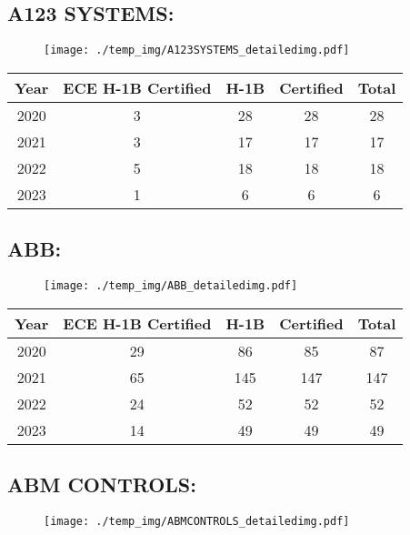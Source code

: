 \documentclass{article}%
\begin{document}
\subsection{A123 SYSTEMS:}%
\label{subsec:A123SYSTEMS}%
\label{A123SYSTEMSdetailed}%


\begin{figure}[htbp]%
\centering%
\texttt{[image: ./temp\_img/A123SYSTEMS\_detailedimg.pdf]}%
\end{figure}

%
\begin{longtable}{c|c|c|c|c}%
\hline%
Year&ECE H{-}1B Certified&H{-}1B&Certified&Total\\%
\hline%
2020&3&28&28&28\\%
\hline%
2021&3&17&17&17\\%
\hline%
2022&5&18&18&18\\%
\hline%
2023&1&6&6&6\\%
\hline%
\end{longtable}

%
\newpage%
\subsection{ABB:}%
\label{subsec:ABB}%
\label{ABBdetailed}%


\begin{figure}[htbp]%
\centering%
\texttt{[image: ./temp\_img/ABB\_detailedimg.pdf]}%
\end{figure}

%
\begin{longtable}{c|c|c|c|c}%
\hline%
Year&ECE H{-}1B Certified&H{-}1B&Certified&Total\\%
\hline%
2020&29&86&85&87\\%
\hline%
2021&65&145&147&147\\%
\hline%
2022&24&52&52&52\\%
\hline%
2023&14&49&49&49\\%
\hline%
\end{longtable}

%
\newpage%
\subsection{ABM CONTROLS:}%
\label{subsec:ABMCONTROLS}%
\label{ABMCONTROLSdetailed}%


\begin{figure}[htbp]%
\centering%
\texttt{[image: ./temp\_img/ABMCONTROLS\_detailedimg.pdf]}%
\end{figure}
\end{document}
